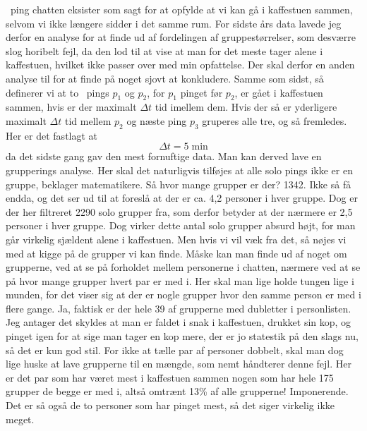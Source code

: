 \documentclass{article}
\newlength\myheight
\newlength\mydepth
\newcommand*\inlinegraphics[1]{%
  \settototalheight\myheight{Xygp}%
  \settodepth\mydepth{Xygp}%
  \raisebox{-\mydepth}{\texttt{[image: \#1]}}%
}
\newcommand{\coffee}[0]{\inlinegraphics{coffee.png}}
\begin{document}
\coffee\ ping chatten eksister som sagt for at opfylde at vi kan gå i kaffestuen sammen, selvom vi ikke længere sidder i det samme rum. For sidste års data lavede jeg derfor en analyse for at finde ud af fordelingen af gruppestørrelser, som desværre slog horibelt fejl, da den lod til at vise at man for det meste tager alene i kaffestuen, hvilket ikke passer over med min opfattelse.
Der skal derfor en anden analyse til for at finde på noget sjovt at konkludere. Samme som sidst, så definerer vi at to \coffee\ pings $p_1$ og $p_2$, for $p_1$ pinget før $p_2$, er gået i kaffestuen sammen, hvis er der maximalt $\Delta t$ tid imellem dem. Hvis der så er yderligere maximalt $\Delta t$ tid mellem $p_2$ og næste ping $p_3$ gruperes alle tre, og så fremledes. Her er det fastlagt at
\[ \Delta t = 5 \; \text{min} \]
da det sidste gang gav den mest fornuftige data. Man kan derved lave en grupperings analyse. Her skal det naturligvis tilføjes at alle solo pings ikke er en gruppe, beklager matematikere. 
Så hvor mange grupper er der? 1342. Ikke så få endda, og det ser ud til at foreslå at der er ca. 4,2 personer i hver gruppe. Dog er der her filtreret 2290 solo grupper fra, som derfor betyder at der nærmere er 2,5 personer i hver gruppe. Dog virker dette antal solo grupper absurd højt, for man går virkelig sjældent alene i kaffestuen. Men hvis vi vil væk fra det, så nøjes vi med at kigge på de grupper vi kan finde.
Måske kan man finde ud af noget om grupperne, ved at se på forholdet mellem personerne i chatten, nærmere ved at se på hvor mange grupper hvert par er med i. Her skal man lige holde tungen lige i munden, for det viser sig at der er nogle grupper hvor den samme person er med i flere gange. Ja, faktisk er der hele 39 af grupperne med dubletter i personlisten. Jeg antager det skyldes at man er faldet i snak i kaffestuen, drukket sin kop, og pinget igen for at sige man tager en kop mere, der er jo statestik på den slags nu, så det er kun god stil. For ikke at tælle par af personer dobbelt, skal man dog lige huske at lave grupperne til en mængde, som nemt håndterer denne fejl.
Her er det par som har været mest i kaffestuen sammen nogen som har hele 175 grupper de begge er med i, altså omtrænt 13\% af alle grupperne! Imponerende. Det er så også de to personer som har pinget mest, så det siger virkelig ikke meget.
\end{document}
